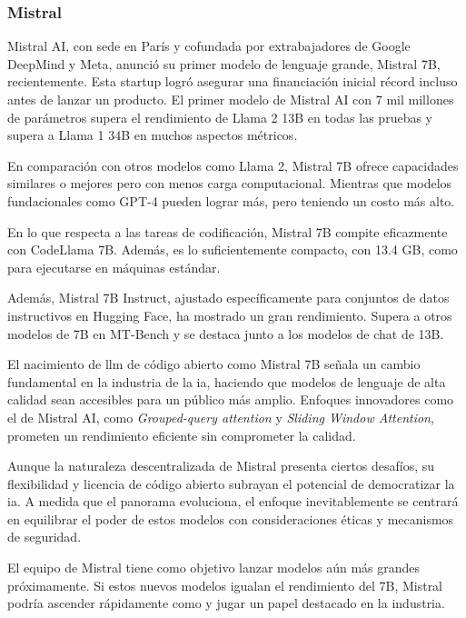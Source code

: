 \subsubsection{Mistral}

Mistral AI, con sede en París y cofundada por extrabajadores de Google DeepMind y Meta, anunció su primer modelo de lenguaje grande, Mistral 7B, recientemente. Esta startup logró asegurar una financiación inicial récord incluso antes de lanzar un producto. El primer modelo de Mistral AI con 7 mil millones de parámetros supera el rendimiento de Llama 2 13B en todas las pruebas y supera a Llama 1 34B en muchos aspectos métricos\cite{Zhong2023AGIEvalAH}.


En comparación con otros modelos como Llama 2, Mistral 7B ofrece capacidades similares o mejores pero con menos carga computacional. Mientras que modelos fundacionales como GPT-4 pueden lograr más, pero teniendo un costo más alto.

En lo que respecta a las tareas de codificación, Mistral 7B compite eficazmente con CodeLlama 7B. Además, es lo suficientemente compacto, con 13.4 GB, como para ejecutarse en máquinas estándar.

Además, Mistral 7B Instruct, ajustado específicamente para conjuntos de datos instructivos en Hugging Face, ha mostrado un gran rendimiento. Supera a otros modelos de 7B en MT-Bench y se destaca junto a los modelos de chat de 13B.

El nacimiento de \acrlong{llm} de código abierto como Mistral 7B señala un cambio fundamental en la industria de la \acrlong{ia}, haciendo que modelos de lenguaje de alta calidad sean accesibles para un público más amplio. Enfoques innovadores como el de Mistral AI, como \textit{Grouped-query attention} y \textit{Sliding Window Attention}, prometen un rendimiento eficiente sin comprometer la calidad\cite{MiitaMistral}.

Aunque la naturaleza descentralizada de Mistral presenta ciertos desafíos, su flexibilidad y licencia de código abierto subrayan el potencial de democratizar la \acrlong{ia}. A medida que el panorama evoluciona, el enfoque inevitablemente se centrará en equilibrar el poder de estos modelos con consideraciones éticas y mecanismos de seguridad.

El equipo de Mistral tiene como objetivo lanzar modelos aún más grandes próximamente. Si estos nuevos modelos igualan el rendimiento del 7B, Mistral podría ascender rápidamente como y jugar un papel destacado en la industria.

